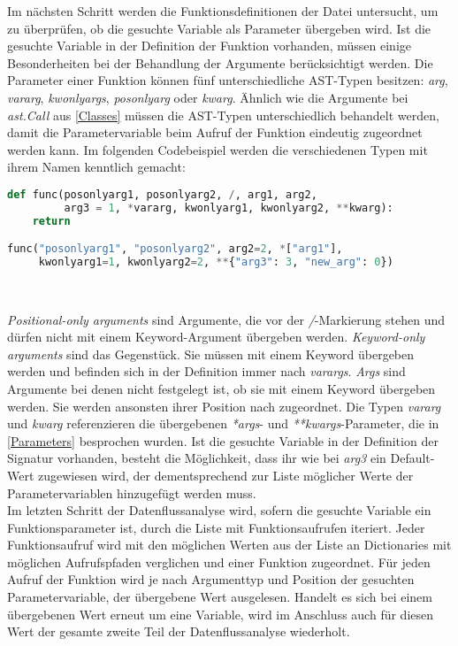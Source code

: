\documentclass[german,bachelor]{swsLeipzig}
\begin{document}
Im nächsten Schritt werden die Funktionsdefinitionen der Datei untersucht, um zu überprüfen, ob die gesuchte Variable als
Parameter übergeben wird.
Ist die gesuchte Variable in der Definition der Funktion vorhanden, müssen einige Besonderheiten bei der Behandlung der Argumente
berücksichtigt werden.
Die Parameter einer Funktion können fünf unterschiedliche AST-Typen besitzen: \textit{arg}, \textit{vararg}, \textit{kwonlyargs},
\textit{posonlyarg} oder \textit{kwarg}.
Ähnlich wie die Argumente bei \textit{ast.Call} aus \ref{Classes} müssen die AST-Typen unterschiedlich behandelt werden, damit die Parametervariable
beim Aufruf der Funktion eindeutig zugeordnet werden kann.
Im folgenden Codebeispiel werden die verschiedenen Typen mit ihrem Namen kenntlich gemacht: \\

\noindent\begin{minipage}{\linewidth}
\begin{lstlisting}[language=Python, frame=single, basicstyle=\small, label=args, caption={Parametertypen von Funktionen},captionpos=b]
def func(posonlyarg1, posonlyarg2, /, arg1, arg2,
         arg3 = 1, *vararg, kwonlyarg1, kwonlyarg2, **kwarg):
    return

func("posonlyarg1", "posonlyarg2", arg2=2, *["arg1"],
     kwonlyarg1=1, kwonlyarg2=2, **{"arg3": 3, "new_arg": 0})
\end{lstlisting}
\end{minipage}
\

\textit{Positional-only arguments} sind Argumente, die vor der \textit{/}-Markierung stehen und dürfen nicht mit einem
Keyword-Argument übergeben werden.
\textit{Keyword-only arguments} sind das Gegenstück.
Sie müssen mit einem Keyword übergeben werden und befinden sich in der Definition immer nach \textit{varargs}.
\textit{Args} sind Argumente bei denen nicht festgelegt ist, ob sie mit einem Keyword übergeben werden.
Sie werden ansonsten ihrer Position nach zugeordnet.
Die Typen \textit{vararg} und \textit{kwarg} referenzieren die übergebenen \textit{*args}- und \textit{**kwargs}-Parameter,
die in \ref{Parameters} besprochen wurden.
Ist die gesuchte Variable in der Definition der Signatur vorhanden, besteht die Möglichkeit, dass ihr wie bei \textit{arg3} ein Default-Wert
zugewiesen wird, der dementsprechend zur Liste möglicher Werte der Parametervariablen hinzugefügt werden muss.\\

Im letzten Schritt der Datenflussanalyse wird, sofern die gesuchte Variable ein Funktionsparameter ist,
durch die Liste mit Funktionsaufrufen iteriert.
Jeder Funktionsaufruf wird mit den möglichen Werten aus der Liste an Dictionaries mit möglichen Aufrufspfaden verglichen und
einer Funktion zugeordnet.
Für jeden Aufruf der Funktion wird je nach Argumenttyp und Position der gesuchten Parametervariable, der übergebene
Wert ausgelesen.
Handelt es sich bei einem übergebenen Wert erneut um eine Variable, wird im Anschluss auch für diesen Wert
der gesamte zweite Teil der Datenflussanalyse wiederholt. \\
\end{document}
